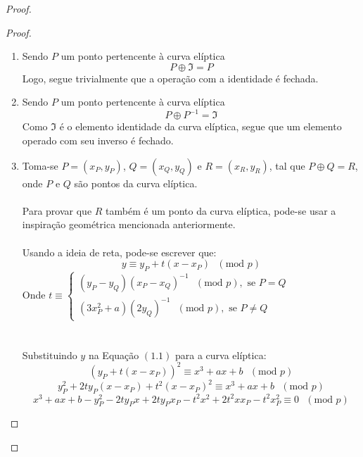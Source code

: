 \documentclass[14pt, oneside]{book}
\theoremstyle{definition}
\begin{document}
\begin{proof}
\begin{proof}
                        \begin{enumerate}
                            \item Sendo $P$ um ponto pertencente à curva elíptica
                            $$P \oplus \Im = P$$
                            Logo, segue trivialmente que a operação com a identidade é fechada.
                            \item Sendo $P$ um ponto pertencente à curva elíptica
                            $$P \oplus P^{-1} = \Im$$
                            Como $\Im$ é o elemento identidade da curva elíptica, segue que um elemento operado com seu inverso é fechado.
                            \item Toma-se $P = (x_P, y_P)$, $Q = (x_Q, y_Q)$ e $R = (x_R, y_R)$, tal que $P \oplus Q = R$, onde $P$ e $Q$ são pontos da curva elíptica.\\ \\
                            Para provar que $R$ também é um ponto da curva elíptica, pode-se usar a inspiração geométrica mencionada anteriormente. \\ \\
                            Usando a ideia de reta, pode-se escrever que:
                            \begin{equation}
                                y \equiv y_P + t(x-x_P) \textrm{ }(\textrm{mod }p)
                            \end{equation}
                            Onde $t \equiv \begin{cases}
                            (y_P - y_Q)(x_P - x_Q)^{-1} \textrm{ }(\textrm{mod }p),\textrm{ se }P=Q\\
                            (3x_P^2+a)(2y_Q)^{-1} \textrm{ }(\textrm{mod }p),\textrm{ se }P\neq Q
                            \end{cases}$ \\ \\ \\
                            Substituindo $y$ na Equação $(1.1)$ para a curva elíptica:
                            $$(y_P + t(x-x_P))^2 \equiv x^3 +ax + b \textrm{ }(\textrm{mod }p)$$
                            $$y_P^2 + 2ty_P(x-x_P) + t^2(x-x_P)^2 \equiv x^3 +ax + b \textrm{ }(\textrm{mod }p)$$
                            $$x^3 +ax + b - y_P^2 -2ty_Px + 2ty_Px_P-t^2x^2+2t^2xx_P-t^2x_P^2 \equiv 0 \textrm{ }(\textrm{mod }p)$$
                        

\end{enumerate}
\end{proof}
\end{proof}
\end{document}
